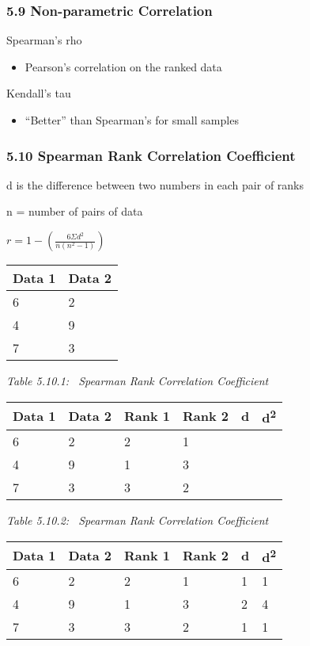 \documentclass[]{article}
\providecommand{\tightlist}{%
  \setlength{\itemsep}{0pt}\setlength{\parskip}{0pt}}
\begin{document}
\hypertarget{non-parametric-correlation}{%
\subsubsection{5.9 Non-parametric
Correlation}\label{non-parametric-correlation}}

Spearman's rho

\begin{itemize}
\tightlist
\item
  Pearson's correlation on the ranked data
\end{itemize}

Kendall's tau

\begin{itemize}
\tightlist
\item
  ``Better'' than Spearman's for small samples
\end{itemize}

\hypertarget{spearman-rank-correlation-coefficient}{%
\subsubsection{5.10 Spearman Rank Correlation
Coefficient}\label{spearman-rank-correlation-coefficient}}

d is the difference between two numbers in each pair of ranks

n = number of pairs of data

\(r=1-(\frac{6\Sigma d^2}{n(n^2 - 1)})\)

\begin{longtable}[]{@{}ll@{}}
\toprule
Data 1 & Data 2\tabularnewline
\midrule
\endhead
6 & 2\tabularnewline
4 & 9\tabularnewline
7 & 3\tabularnewline
\bottomrule
\end{longtable}

\emph{Table 5.10.1: ~Spearman Rank Correlation Coefficient}

\begin{longtable}[]{@{}llllll@{}}
\toprule
Data 1 & Data 2 & Rank 1 & Rank 2 & d &
d\textsuperscript{2}\tabularnewline
\midrule
\endhead
6 & 2 & 2 & 1 & &\tabularnewline
4 & 9 & 1 & 3 & &\tabularnewline
7 & 3 & 3 & 2 & &\tabularnewline
\bottomrule
\end{longtable}

\emph{Table 5.10.2: ~Spearman Rank Correlation Coefficient}

\begin{longtable}[]{@{}llllll@{}}
\toprule
Data 1 & Data 2 & Rank 1 & Rank 2 & d &
d\textsuperscript{2}\tabularnewline
\midrule
\endhead
6 & 2 & 2 & 1 & 1 & 1\tabularnewline
4 & 9 & 1 & 3 & 2 & 4\tabularnewline
7 & 3 & 3 & 2 & 1 & 1\tabularnewline
\bottomrule
\end{longtable}
\end{document}
